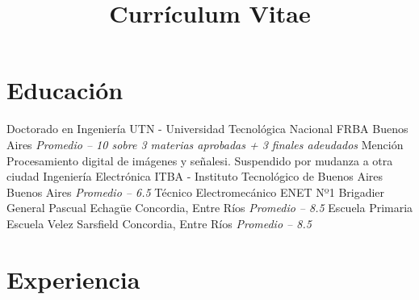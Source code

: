 \documentclass[11pt,a4paper,sans]{moderncv} 	%
\title 			{Currículum Vitae}
\begin{document}
\makecvtitle %
\section{Educación}
	{Doctorado en Ingeniería} 	{UTN - Universidad Tecnológica Nacional FRBA}	{Buenos Aires} 		{\textit{Promedio -- 10 sobre 3 materias aprobadas + 3 finales adeudados}} 	{Mención Procesamiento digital de imágenes y señalesi. Suspendido por mudanza a otra ciudad} 
 	{Ingeniería Electrónica} 	{ITBA - Instituto Tecnológico de Buenos Aires}	{Buenos Aires} 		{\textit{Promedio -- 6.5}} 							{}
 	{Técnico Electromecánico} 	{ENET Nº1 Brigadier General Pascual Echagüe}	{Concordia, Entre Ríos} {\textit{Promedio -- 8.5}} 							{}
 	{Escuela Primaria} 		{Escuela Velez Sarsfield}			{Concordia, Entre Ríos} {\textit{Promedio -- 8.5}} 							{}
\section{Experiencia}
\end{document}
